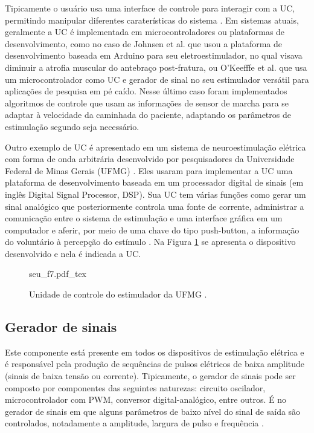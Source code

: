 Tipicamente o usuário usa uma interface de controle para interagir com a \acrshort{UC}, permitindo manipular diferentes caraterísticas do sistema \cite{Souza2012a, Wu2002, Popovic2004, Masdar2012}. Em sistemas atuais, geralmente a \acrshort{UC} é implementada em microcontroladores ou plataformas de desenvolvimento, como no caso de Johnsen et al. \cite{Johnsen2011} que usou a plataforma de desenvolvimento baseada em Arduino para seu eletroestimulador, no qual visava diminuir a atrofia muscular do antebraço post-fratura, ou O’Keefffe et al. \cite{OKeeffe2002a} que usa um microcontrolador como \acrshort{UC} e gerador de sinal no seu estimulador versátil para aplicações de pesquisa em pé caído. Nesse último caso foram implementados algoritmos de controle que usam as informações de sensor de marcha para se adaptar à velocidade da caminhada do paciente, adaptando os parâmetros de estimulação segundo seja necessário.

Outro exemplo de \acrshort{UC} é apresentado em um sistema de neuroestimulação elétrica com forma de onda arbitrária desenvolvido por pesquisadores da Universidade Federal de Minas Gerais (\acrshort{UFMG}) \cite{Martins2008}. Eles usaram para implementar a \acrshort{UC} uma plataforma de desenvolvimento baseada em um processador digital de sinais (em inglês Digital Signal Processor, \acrshort{DSP}). Sua \acrshort{UC} tem várias funções como gerar um sinal analógico que posteriormente controla uma fonte de corrente, administrar a comunicação entre o sistema de estimulação e uma interface gráfica em um computador e aferir, por meio de uma chave do tipo push-button, a informação do voluntário à percepção do estímulo \cite{Martins2008}. Na Figura \ref{fig:seu_f7} se apresenta o dispositivo desenvolvido e nela é indicada a \acrshort{UC}.

\begin{figure}
    \centering %
    \small %
    \def\svgwidth{0.4
    \columnwidth}%
    {seu_f7.pdf_tex}
    \caption{Unidade de controle do estimulador da \acrshort{UFMG}   \cite{Martins2008}.}
    \label{fig:seu_f7}
\end{figure}

\subsection{Gerador de sinais}
Este componente está presente em todos os dispositivos de estimulação elétrica e é responsável pela produção de sequências de pulsos elétricos de baixa amplitude (sinais de baixa tensão ou corrente). Tipicamente, o gerador de sinais pode ser composto por componentes das seguintes naturezas: circuito oscilador, microcontrolador com \acrshort{PWM}, conversor digital-analógico, entre outros.  É no gerador de sinais em que alguns parâmetros de baixo nível do sinal de saída são controlados, notadamente a amplitude, largura de pulso e frequência \cite{Cheng2004, Wu2002}.

